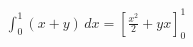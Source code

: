 \documentclass[preview]{standalone}
\begin{document}
\begin{align*}
\int_0^1 (x + y) \, dx = \left[ \frac{x^2}{2} + yx \right]_0^1
\end{align*}
\end{document}
